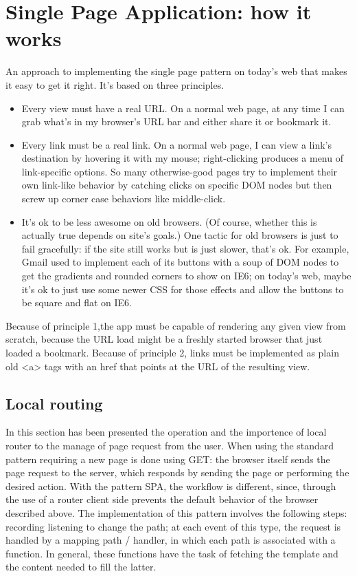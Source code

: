 \section{Single Page Application: how it works}
\label{sec:ARC_function}

An approach to implementing the single page pattern on today's web that makes it easy to get it right. It's based on three principles.
\begin{itemize}
\item Every view must have a real URL. On a normal web page, at any time I can grab what's in my browser's URL bar and either share it or bookmark it.
\item Every link must be a real link. On a normal web page, I can view a link's destination by hovering it with my mouse; right-clicking produces a menu of link-specific options. So many otherwise-good pages try to implement their own link-like behavior by catching clicks on specific DOM nodes but then screw up corner case behaviors like middle-click.
\item It's ok to be less awesome on old browsers. (Of course, whether this is actually true depends on site's goals.) One tactic for old browsers is just to fail gracefully: if the site still works but is just slower, that's ok. For example, Gmail used to implement each of its buttons with a soup of DOM nodes to get the gradients and rounded corners to show on IE6; on today's web, maybe it's ok to just use some newer CSS for those effects and allow the buttons to be square and flat on IE6.
\end{itemize}

Because of principle 1,the  app must be capable of rendering any given view from scratch, because the URL load might be a freshly started browser that just loaded a bookmark. Because of principle 2, links must be implemented as plain old <a> tags with an href that points at the URL of the resulting view.
\cite{arc_tech}

\subsection{Local routing}

In this section has been presented the operation and the importence of local router to the manage of page request from the user.
When using the standard pattern requiring a new page is done using GET: the browser itself sends the page request to the server, which responds by sending the page or performing the desired action.
With the pattern SPA, the workflow is different, since, through the use of a router client side prevents the default behavior of the browser described above.
The implementation of this pattern involves the following steps: recording listening to change the path; at each event of this type, the request is handled by a mapping path / handler, in which each path is associated with a function. In general, these functions have the task of fetching the template and the content needed to fill the latter.

